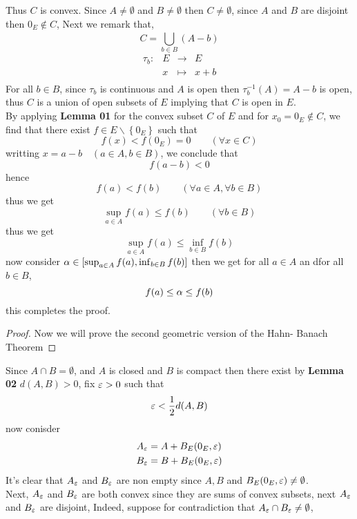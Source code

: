\documentclass{report}
\begin{document}
Thus $C $ is convex.
\divider
Since $A \neq \emptyset$ and $B \neq \emptyset  $  then 
$C \neq \emptyset  $, since $A $ and $B $ 
are disjoint then $0_{E} \notin C $, Next we remark 
that,
\[
C = \bigcup_{b \in B}^{}  
\left( 
	A - b
\right)
\]
\[
\begin{array}{cccc}
      \tau _{b} : &    E & \longrightarrow &  E\\
           &    x & \longmapsto     &  x+b\\ 
\end{array}
\]
For all $b \in B$, 
since $\tau _{b} $ is continuous 
and $A $ is open then $\tau ^{-1} _{b} (A) = A-b $  is open,
thus $C $ is a union of open
subsets of $E $ implying that $C $ is open in $E $.\\
By applying \textbf{Lemma 01} for the convex
subset $C $ of $E $ and for $x_0 = 0_{E} \notin C $, 
we find that there exist $f \in  E \backslash \left\{ 
	0_{E}
\right\} $ 
such that 
\[
f(x) <  f(0_{E})  = 0 \quad 
\quad 
\left( 
	\forall  x \in  C
\right)
\] 
writting $x = a-b \quad (a \in A, b \in B)  $, we conclude
that 
\[
f(a-b) <  0
\]
hence
\[
	f(a)  <  f(b)  \quad 
	\quad  
	\left( 
		\forall  a \in  A, \forall  b \in B 
	\right)
\] 
thus we get 
\[
\sup_{a \in A} f(a)  \leq 
f(b)  \quad \quad 
\left( 
	\forall  b \in  B
\right)
\] 
thus we get
\[
\sup_{ a \in A} 
f(a)  \leq 
\inf_{b \in B} f(b) 
\]
now consider $\alpha \in [\sup_{a \in A} f(a) , \inf_{b \in  B} f(b) ] $  
then we get for all $a \in  A $ an dfor all $b \in B $, 
\[
f(a) \leq \alpha \leq  f(b) 
\]
this completes the proof. 
\begin{proof}
Now we will prove the second geometric version of the Hahn-
Banach Theorem
\end{proof}
Since $A \cap B = \emptyset  $, and $A $ 
is closed and $B $ is compact then there exist by 
\textbf{Lemma 02} $d(A,B) > 0 $, fix $\varepsilon  > 0 $ such that
\[
	\varepsilon  < \frac{1}{2}
	d(A,B) 
\] 
now conisder
\begin{align*}
	A_{\varepsilon } &=
	A + B_{E}(0_{E},\varepsilon )  \\
	B_{\varepsilon }&=
	B + B_{E}(0_{E},\varepsilon ) 
\end{align*}
It's clear that $A _{\varepsilon } $ and 
$B_{\varepsilon } $ are non empty since $A,B$ and 
$B_{E}(0_{E}, \varepsilon )  \neq  \emptyset  $. \\
Next, $A_{\varepsilon } $ and $B_{\varepsilon } $  are both convex
since they are sums of convex subsets, next 
$A_{\varepsilon } $ and $B_{\varepsilon } $ are disjoint, 
Indeed, suppose for contradiction that 
$A_{\varepsilon } \cap B_{\varepsilon }\neq  \emptyset  $, 
\end{document}
